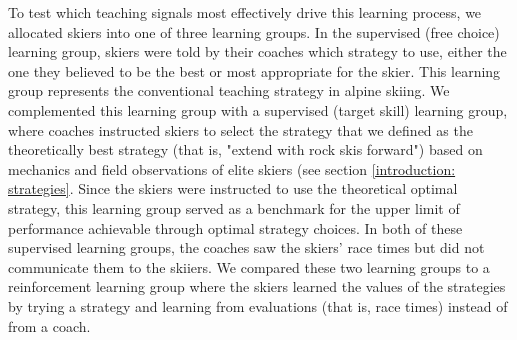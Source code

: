 To test which teaching signals most effectively drive this learning process, we allocated skiers into one of three learning groups. In the supervised (free choice) learning group, skiers were told by their coaches which strategy to use, either the one they believed to be the best or most appropriate for the skier. This learning group represents the conventional teaching strategy in alpine skiing. We complemented this learning group with a supervised (target skill) learning group, where coaches instructed skiers to select the strategy that we defined as the theoretically best strategy (that is, "extend with rock skis forward") based on mechanics and field observations of elite skiers (see section \ref{introduction: strategies}. Since the skiers were instructed to use the theoretical optimal strategy, this learning group served as a benchmark for the upper limit of performance achievable through optimal strategy choices. In both of these supervised learning groups, the coaches saw the skiers’ race times but did not communicate them to the skiiers. We compared these two learning groups to a reinforcement learning group where the skiers learned the values of the strategies by trying a strategy and learning from evaluations (that is, race times) instead of from a coach.

